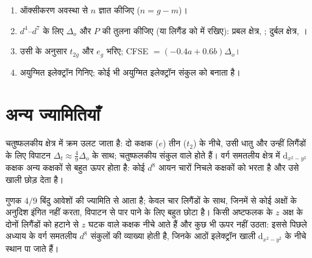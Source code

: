 \begin{method}\label{met:b2:ligand-field:spin-state}
\begin{enumerate}
  \item ऑक्सीकरण अवस्था से $n$ ज्ञात कीजिए ($n = g - m$)।
  \item $d^4$--$d^7$ के लिए $\Delta_o$ और $P$ की तुलना कीजिए (या लिगैंड को
         में रखिए): प्रबल क्षेत्र, ; दुर्बल क्षेत्र, ।
  \item उसी के अनुसार $t_{2g}$ और $e_g$ भरिए; CFSE $= (-0.4a + 0.6b)\Delta_o$।
  \item अयुग्मित इलेक्ट्रॉन गिनिए; कोई भी अयुग्मित इलेक्ट्रॉन संकुल को
         बनाता है।
\end{enumerate}
\end{method}

\section{अन्य ज्यामितियाँ}

\begin{proposition}\label{prop:b2:ligand-field:tetrahedral}
चतुष्फलकीय क्षेत्र में क्रम उलट जाता है: दो कक्षक ($e$) तीन ($t_2$) के नीचे,
उसी धातु और उन्हीं लिगैंडों के लिए विपाटन $\Delta_t \approx \frac49\Delta_o$ के साथ; चतुष्फलकीय
संकुल  वाले होते हैं। वर्ग समतलीय क्षेत्र में $\mathrm d_{x^2-y^2}$ कक्षक अन्य कक्षकों से बहुत
ऊपर होता है: कोई $d^8$ आयन चारों निचले कक्षकों को भरता है और उसे खाली छोड़ देता है।
\end{proposition}

\admitted

गुणक $4/9$ बिंदु आवेशों की ज्यामिति से आता है; केवल चार लिगैंडों के साथ,
जिनमें से कोई अक्षों के अनुदिश इंगित नहीं करता, विपाटन 
से पार पाने के लिए बहुत छोटा है। किसी अष्टफलक के $z$ अक्ष के दोनों लिगैंडों को हटाने से
$z$ घटक वाले कक्षक नीचे आते हैं और कुछ भी ऊपर नहीं उठता: इससे
पिछले अध्याय के वर्ग समतलीय $d^8$ संकुलों की व्याख्या होती है, जिनके आठों इलेक्ट्रॉन खाली
$\mathrm d_{x^2-y^2}$ के नीचे स्थान पा जाते हैं।

